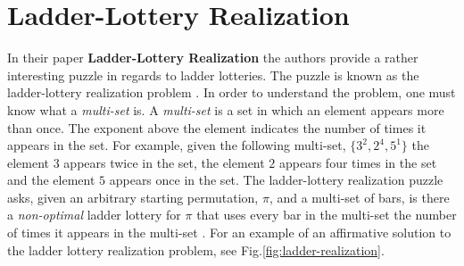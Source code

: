 

\section{Ladder-Lottery Realization}

In their paper \textbf{Ladder-Lottery Realization} the authors provide 
a rather interesting puzzle in regards to ladder lotteries. The puzzle 
is known as the ladder-lottery realization problem \cite{A3}. In order to understand
the problem, one must know what a \emph{multi-set} is. A \emph{multi-set}
is a set in which an element appears more than once. The exponent 
above the element indicates the number of times it appears in the set.
For example, given the following multi-set, $\{3^{2}, 2^{4}, 5^{1}\}$ 
the element $3$ appears twice in the set, the element $2$ appears four times
in the set and the element $5$ appears once in the set.
The ladder-lottery realization puzzle asks, given an arbitrary starting permutation, $\pi$, 
and a multi-set of bars, 
is there a \emph{non-optimal} ladder lottery for $\pi$
that uses every bar in the multi-set the number 
of times it appears in the  multi-set \cite{A3}. 
For an example of an affirmative solution to the ladder lottery realization problem, see Fig.\ref{fig:ladder-realization}.

